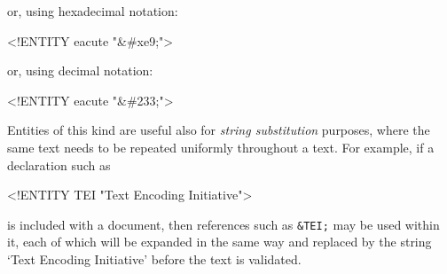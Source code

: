 \par\egroup 
 or, using hexadecimal notation: \par\hfill\bgroup\exampleFont\vskip 10pt\begin{shaded}
\obeyspaces <!ENTITY eacute "\&\#xe9;">\end{shaded}
\par\egroup 
 or, using decimal notation: \par\hfill\bgroup\exampleFont\vskip 10pt\begin{shaded}
\obeyspaces <!ENTITY eacute "\&\#233;">\end{shaded}
\par\egroup 
\par
Entities of this kind are useful also for \textit{string substitution} purposes, where the same text needs to be repeated uniformly throughout a text. For example, if a declaration such as \par\hfill\bgroup\exampleFont\vskip 10pt\begin{shaded}
\obeyspaces <!ENTITY TEI "Text Encoding Initiative">\end{shaded}
\par\egroup 
 is included with a document, then references such as \texttt{\&TEI;} may be used within it, each of which will be expanded in the same way and replaced by the string ‘Text Encoding Initiative’ before the text is validated.
